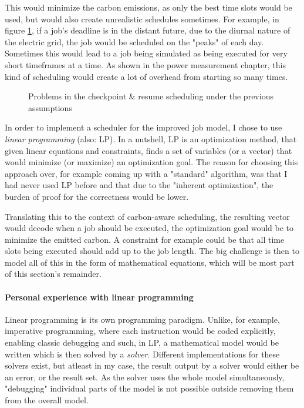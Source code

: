 This would minimize the carbon emissions, as only the best time slots would be used, but would also create unrealistic schedules sometimes. 
For example, in figure \ref{fig:schedule_problems}, if a job's deadline is in the distant future, due to the diurnal nature of the electric grid, the job would be scheduled on the "peaks" of each day. Sometimes this would lead to a job being simulated as being executed for very short timeframes at a time. As shown in the power measurement chapter, this kind of scheduling would create a lot of overhead from starting so many times.

\begin{figure}
    \caption{Problems in the checkpoint \& resume scheduling under the previous assumptions}
    \label{fig:schedule_problems}
\end{figure}


In order to implement a scheduler for the improved job model, I chose to use \emph{linear programming} (also: LP).
In a nutshell, LP is an optimization method, that given linear equations and constraints, finds a set of variables (or a vector) that would minimize (or maximize) an optimization goal. 
The reason for choosing this approach over, for example coming up with a "standard" algorithm, was that I had never used LP before and that due to the "inherent optimization", the burden of proof for the correctness would be lower.

Translating this to the context of carbon-aware scheduling, the resulting vector would decode when a job should be executed, the optimization goal would be to minimize the emitted carbon. 
A constraint for example could be that all time slots being executed should add up to the job length. 
The big challenge is then to model all of this in the form of mathematical equations, which will be most part of this section's remainder.

\paragraph{Personal experience with linear programming}

Linear programming is its own programming paradigm. Unlike, for example, imperative programming, where each instruction would be coded explicitly, enabling classic debugging and such, in LP, a mathematical model would be written which is then solved by a \emph{solver}. 
Different implementations for these solvers exist, but atleast in my case, the result output by a solver would either be an error, or the result set. 
As the solver uses the whole model simultaneously, "debugging" individual parts of the model is not possible outside removing them from the overall model.

